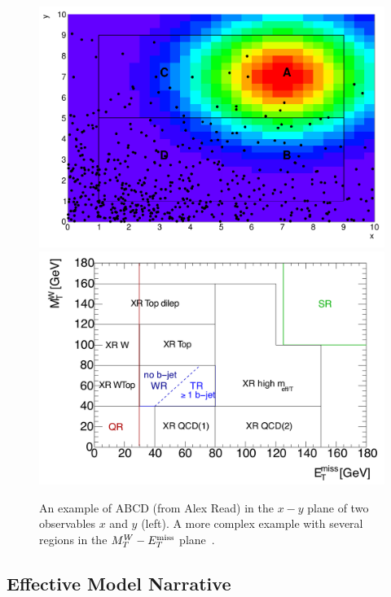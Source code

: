 \documentclass{cernrep}
\begin{document}
\begin{figure}[htbp]
\begin{center}
\includegraphics[width=.47\textwidth]{ABCD}%
\includegraphics[width=.5\textwidth]{SUSY-2011-08-figaux_01a}
\caption{An example of ABCD (from Alex Read) in the $x-y$ plane of two observables $x$ and $y$ (left).  A more complex example with several regions in the $M_T^W-E_T^{\rm miss}$ plane~\cite{ATLAS:2011ad}.}
\label{fig:ABCD}
\end{center}
\end{figure}



\subsection{Effective Model Narrative}
\end{document}
